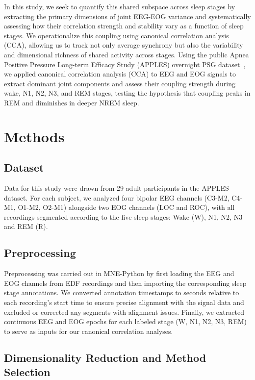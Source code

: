 In this study, we seek to quantify this shared subspace across sleep stages by extracting the primary dimensions of joint EEG-EOG variance and systematically assessing how their correlation strength and stability vary as a function of sleep stages. We operationalize this coupling using canonical correlation analysis (CCA), allowing us to track not only average synchrony but also the variability and dimensional richness of shared activity across stages. Using the public Apnea Positive Pressure Long-term Efficacy Study (APPLES) overnight PSG dataset~\cite{mueller_nsrr}, we applied canonical correlation analysis (CCA) to EEG and EOG signals to extract dominant joint components and assess their coupling strength during wake, N1, N2, N3, and REM stages, testing the hypothesis that coupling peaks in REM and diminishes in deeper NREM sleep.
 
\section{Methods}

\subsection{Dataset}

Data for this study were drawn from 29 adult participants in the APPLES dataset. For each subject, we analyzed four bipolar EEG channels (C3-M2, C4-M1, O1-M2, O2-M1) alongside two EOG channels (LOC and ROC), with all recordings segmented according to the five sleep stages: Wake (W), N1, N2, N3 and REM (R).

\subsection{Preprocessing}

Preprocessing was carried out in MNE-Python by first loading the EEG and EOG channels from EDF recordings and then importing the corresponding sleep stage annotations. We converted annotation timestamps to seconds relative to each recording's start time to ensure precise alignment with the signal data and excluded or corrected any segments with alignment issues. Finally, we extracted continuous EEG and EOG epochs for each labeled stage (W, N1, N2, N3, REM) to serve as inputs for our canonical correlation analyses.

\subsection{Dimensionality Reduction and Method Selection}

